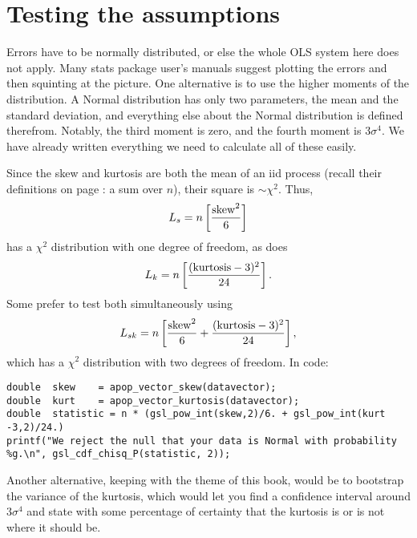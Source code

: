 
\section{Testing the assumptions} Errors have to be normally distributed, or else
the whole OLS system here does not apply. Many stats package user's manuals
suggest plotting the errors and then squinting at the picture. One
alternative is to use the higher moments of the distribution.
A Normal distribution has only two parameters,  the mean and the
standard deviation, and everything else about the Normal distribution is
defined therefrom. Notably, the third moment is zero, and the fourth
moment is $3 \sigma^4$. We have already written everything we need to
calculate all of these easily.


Since the skew and kurtosis are both the mean of an iid process (recall
their definitions on page \pageref{kurtskew}: a sum over $n$), their
square is $\sim \chi^2$. Thus,
$$L_s = n\left[{{\rm skew}^2\over 6}\right]$$
has a $\chi^2$ distribution with one degree of freedom, as does
$$L_k = n\left[{({\rm kurtosis}-3)^2\over 24}\right].$$
Some prefer to test both simultaneously using
$$L_{sk} = n\left[{{\rm skew}^2\over 6} + {({\rm kurtosis}-3)^2\over 24}\right],$$
which has a $\chi^2$ distribution with two degrees of freedom. In code:

\begin{lstlisting}
double  skew    = apop_vector_skew(datavector);
double  kurt    = apop_vector_kurtosis(datavector);
double  statistic = n * (gsl_pow_int(skew,2)/6. + gsl_pow_int(kurt -3,2)/24.)
printf("We reject the null that your data is Normal with probability %g.\n", gsl_cdf_chisq_P(statistic, 2));
\end{lstlisting}

Another alternative, keeping with the theme of this book, would be
to bootstrap the variance of the kurtosis, which would let you find a
confidence interval around $3 \sigma^4$ and state with some percentage
of certainty that the kurtosis is or is not where it should be.
